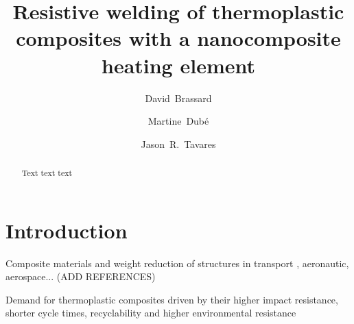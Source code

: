 \documentclass[11pt,review,times]{elsarticle}
\begin{document}


\title{Resistive welding of thermoplastic composites with a nanocomposite heating element}

\author[polymtl,crepec]{David~Brassard}
\author[ets,crepec]{Martine~Dubé}
\author[polymtl,crepec]{Jason~R.~Tavares}


\address[polymtl]{Department of Chemical Engineering, Polytechnique Montréal, P.O. Box 6079 Station Centre-Ville, Montréal, QC, H3C 3A7, Canada}
\address[ets]{Department of Mechanical Engineering, École de technologie supérieure, 1100 Notre-Dame Street West, Montréal, Québec, Canada, H3C 1K3}
\address[crepec]{Research Center for High Performance Polymer and Composite Systems (CREPEC), Polytechnique Montréal, P.O. Box 6079 Station Centre-Ville, Montréal, QC, H3C 3A7, Canada}

\begin{abstract}
Text text text
\end{abstract}

\begin{keyword}

\end{keyword}

\maketitle


							\section{Introduction}

Composite materials and weight reduction of structures in transport \cite{FordMotorLLC2018}, aeronautic, aerospace... (ADD REFERENCES)

Demand for thermoplastic composites driven by their higher impact resistance, shorter cycle times, recyclability and higher environmental resistance \cite{cogswell1992}
\end{document}

